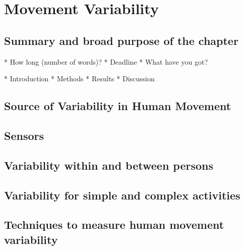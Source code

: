 
\chapter{Movement Variability}

\ifpdf
    \graphicspath{{chapter2/figs/raster/}{chapter2/figs/PDF/}{chapter2/figs/}}
\else
    \graphicspath{{chapter2/figs/vector/}{chapter2/figs/}}
\fi

\section*{Summary and broad purpose of the chapter}
* How long (number of words)?
* Deadline
* What have you got?

* Introduction
* Methods
* Results
* Discussion




\section{Source of Variability in Human Movement}
\lipsum[1-4]

\section{Sensors}
\section{Variability within and between persons}
\section{Variability for simple and complex activities}


\section[Short title]{Techniques to measure human movement variability}



